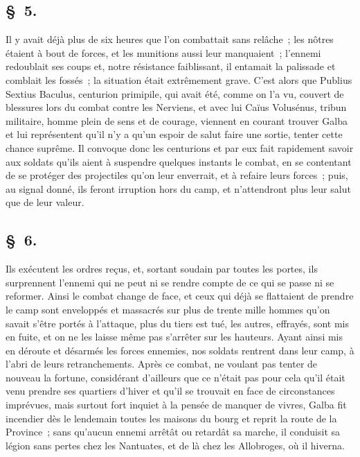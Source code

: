 \documentclass[french,twoside]{book} %
\begin{document}
\subsection[{§ 5.}]{ \textsc{§ 5.} }
\noindent Il y avait déjà plus de six heures que l’on combattait sans relâche ; les nôtres étaient à bout de forces, et les munitions aussi leur manquaient ; l’ennemi redoublait ses coups et, notre résistance faiblissant, il entamait la palissade et comblait les fossés ; la situation était extrêmement grave. C'est alors que Publius Sextius Baculus, centurion primipile, qui avait été, comme on l’a vu, couvert de blessures lors du combat contre les Nerviens, et avec lui Caïus Volusénus, tribun militaire, homme plein de sens et de courage, viennent en courant trouver Galba et lui représentent qu’il n’y a qu’un espoir de salut faire une sortie, tenter cette chance suprême. Il convoque donc les centurions et par eux fait rapidement savoir aux soldats qu’ils aient à suspendre quelques instants le combat, en se contentant de se protéger des projectiles qu’on leur enverrait, et à refaire leurs forces ; puis, au signal donné, ils feront irruption hors du camp, et n’attendront plus leur salut que de leur valeur.
\subsection[{§ 6.}]{ \textsc{§ 6.} }
\noindent Ils exécutent les ordres reçus, et, sortant soudain par toutes les portes, ils surprennent l’ennemi qui ne peut ni se rendre compte de ce qui se passe ni se reformer. Ainsi le combat change de face, et ceux qui déjà se flattaient de prendre le camp sont enveloppés et massacrés sur plus de trente mille hommes qu’on savait s’être portés à l’attaque, plus du tiers est tué, les autres, effrayés, sont mis en fuite, et on ne les laisse même pas s’arrêter sur les hauteurs. Ayant ainsi mis en déroute et désarmés les forces ennemies, nos soldats rentrent dans leur camp, à l’abri de leurs retranchements. Après ce combat, ne voulant pas tenter de nouveau la fortune, considérant d’ailleurs que ce n’était pas pour cela qu’il était venu prendre ses quartiers d’hiver et qu’il se trouvait en face de circonstances imprévues, mais surtout fort inquiet à la pensée de manquer de vivres, Galba fit incendier dès le lendemain toutes les maisons du bourg et reprit la route de la Province ; sans qu’aucun ennemi arrêtât ou retardât sa marche, il conduisit sa légion sans pertes chez les Nantuates, et de là chez les Allobroges, où il hiverna.
\end{document}
